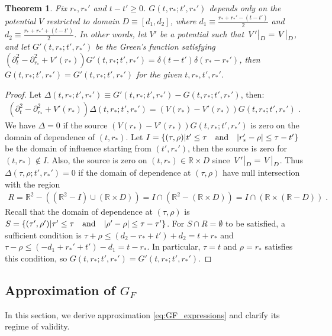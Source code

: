 \documentclass[reprint,aps,physrev,superscriptaddress,10pt,notitlepage,prd,nofootinbib,onecolumn]{revtex4-2}
\newtheorem{theorem}{Theorem}
\begin{document}
\begin{theorem}
  Fix $r_*, r_*'$ and $t-t' \geq 0$.
  $G(t,r_*;t',r_*')$ depends only on the potential $V$ restricted to domain $D \equiv [d_1, d_2]$, where $d_1 \equiv \frac{r_*+r_*' - (t-t')}{2}$ and $d_2 \equiv \frac{r_*+r_*' + (t-t')}{2}$.
  In other words, let $V'$ be a potential such that $\eval{V'}_D = \eval{V}_D$, and let $G'(t,r_*;t',r_*')$ be the Green's function satisfying $(\partial_t^2 - \partial_{r_*}^2 + V'(r_*)) G'(t,r_*;t',r_*') =  \delta(t-t') \delta(r_*-r_*')$, then $G(t,r_*;t',r_*') = G'(t,r_*;t',r_*')$ for the given $t,r_*,t',r_*'$.
\end{theorem}
\begin{proof}
  Let $\Delta(t,r_*;t',r_*') \equiv G'(t,r_*;t',r_*') - G(t,r_*;t',r_*')$, then:
  \begin{align}
   (\partial_t^2 - \partial_{r_*}^2 + V'(r_*)) \Delta(t,r_*;t',r_*') = (V(r_*)  - V'(r_*)) G(t,r_*;t',r_*') \;.
  \end{align}
  We have $\Delta = 0$ if the source $ (V(r_*)  - V'(r_*)) G(t,r_*;t',r_*')$ is zero on the domain of dependence of $(t,r_*)$.
  Let $I = \{(\tau,\rho) | t' \leq \tau \qq{and} \abs{r_*' - \rho} \leq \tau - t'\}$ be the domain of influence starting from $(t',r_*')$, then the source is zero for $(t,r_*) \notin I$.
  Also, the source is zero on $(t,r_*) \in \mathbb{R} \times D$ since $\eval{V'}_D = \eval{V}_D$.
  Thus $\Delta(\tau,\rho;t',r_*') = 0$ if the domain of dependence at $(\tau,\rho)$ have null intersection with the region
  \begin{align}
    R = \mathbb{R}^2 - ((\mathbb{R}^2 - I) \cup (\mathbb{R} \times D))
    = I \cap (\mathbb{R}^2 - (\mathbb{R} \times D))
    = I \cap (\mathbb{R} \times (\mathbb{R} - D)) \;.
  \end{align}
  Recall that the domain of dependence at $(\tau,\rho)$ is $S = \{(\tau',\rho') | \tau' \leq \tau \qq{and} \abs{\rho' - \rho} \leq \tau - \tau'\}$.
  For $S \cap R = \emptyset$ to be satisfied, a sufficient condition is  $\tau + \rho \leq  (d_2 - r_* + t') + d_2 = t + r_*$ and $\tau - \rho \leq (-d_1 + r_*' + t')- d_1 = t - r_*$.
  In particular, $\tau = t$ and $\rho = r_*$ satisfies this condition, so $G(t,r_*;t',r_*') = G'(t,r_*;t',r_*')$.
\end{proof}



\subsection{Approximation of $G_F$}
\label{sec:GF_approximation}
In this section, we derive approximation \eqref{eq:GF_expressions} and clarify its regime of validity.
\end{document}
